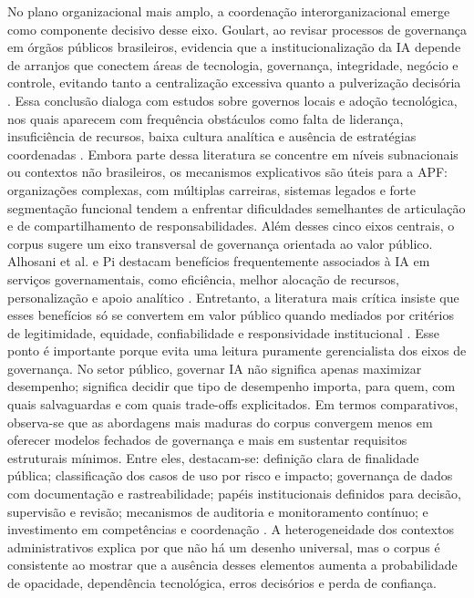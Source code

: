 \documentclass[12pt,a4paper]{article}
\begin{document}
No plano organizacional mais amplo, a coordenação interorganizacional emerge como componente decisivo desse eixo. Goulart, ao revisar processos de governança em órgãos públicos brasileiros, evidencia que a institucionalização da IA depende de arranjos que conectem áreas de tecnologia, governança, integridade, negócio e controle, evitando tanto a centralização excessiva quanto a pulverização decisória \autocite{goulart2025processos}. Essa conclusão dialoga com estudos sobre governos locais e adoção tecnológica, nos quais aparecem com frequência obstáculos como falta de liderança, insuficiência de recursos, baixa cultura analítica e ausência de estratégias coordenadas \autocite{yiitcanlar2022artificial} \autocite{david2023understanding}. Embora parte dessa literatura se concentre em níveis subnacionais ou contextos não brasileiros, os mecanismos explicativos são úteis para a APF: organizações complexas, com múltiplas carreiras, sistemas legados e forte segmentação funcional tendem a enfrentar dificuldades semelhantes de articulação e de compartilhamento de responsabilidades.
Além desses cinco eixos centrais, o corpus sugere um eixo transversal de governança orientada ao valor público. Alhosani et al. e Pi destacam benefícios frequentemente associados à IA em serviços governamentais, como eficiência, melhor alocação de recursos, personalização e apoio analítico \autocite{alhosani2024opportunities} \autocite{pi2021machine}. Entretanto, a literatura mais crítica insiste que esses benefícios só se convertem em valor público quando mediados por critérios de legitimidade, equidade, confiabilidade e responsividade institucional \autocite{criado2024artificial} \autocite{sigfrids2022how}. Esse ponto é importante porque evita uma leitura puramente gerencialista dos eixos de governança. No setor público, governar IA não significa apenas maximizar desempenho; significa decidir que tipo de desempenho importa, para quem, com quais salvaguardas e com quais trade-offs explicitados.
Em termos comparativos, observa-se que as abordagens mais maduras do corpus convergem menos em oferecer modelos fechados de governança e mais em sustentar requisitos estruturais mínimos. Entre eles, destacam-se: definição clara de finalidade pública; classificação dos casos de uso por risco e impacto; governança de dados com documentação e rastreabilidade; papéis institucionais definidos para decisão, supervisão e revisão; mecanismos de auditoria e monitoramento contínuo; e investimento em competências e coordenação \autocite{batool2025ai} \autocite{mkander2023auditing} \autocite{minkkinen2022continuous} \autocite{melo2026competencias}. A heterogeneidade dos contextos administrativos explica por que não há um desenho universal, mas o corpus é consistente ao mostrar que a ausência desses elementos aumenta a probabilidade de opacidade, dependência tecnológica, erros decisórios e perda de confiança.
\end{document}
